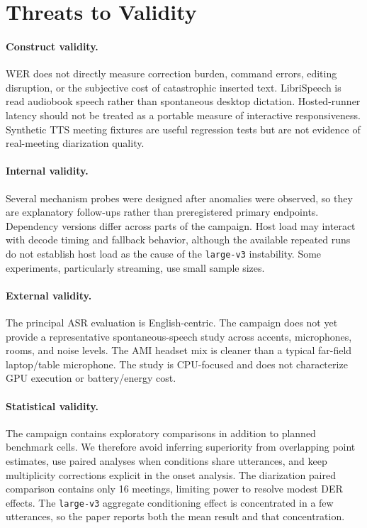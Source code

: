 \section{Threats to Validity}

\paragraph{Construct validity.}
WER does not directly measure correction burden, command errors, editing disruption, or the
subjective cost of catastrophic inserted text. LibriSpeech is read audiobook speech rather than
spontaneous desktop dictation. Hosted-runner latency should not be treated as a portable measure
of interactive responsiveness. Synthetic TTS meeting fixtures are useful regression tests but
are not evidence of real-meeting diarization quality.

\paragraph{Internal validity.}
Several mechanism probes were designed after anomalies were observed, so they are explanatory
follow-ups rather than preregistered primary endpoints. Dependency versions differ across parts
of the campaign. Host load may interact with decode timing and fallback behavior, although the
available repeated runs do not establish host load as the cause of the \texttt{large-v3}
instability. Some experiments, particularly streaming, use small sample sizes.

\paragraph{External validity.}
The principal ASR evaluation is English-centric. The campaign does not yet provide a
representative spontaneous-speech study across accents, microphones, rooms, and noise levels.
The AMI headset mix is cleaner than a typical far-field laptop/table microphone. The study is
CPU-focused and does not characterize GPU execution or battery/energy cost.

\paragraph{Statistical validity.}
The campaign contains exploratory comparisons in addition to planned benchmark cells. We
therefore avoid inferring superiority from overlapping point estimates, use paired analyses when
conditions share utterances, and keep multiplicity corrections explicit in the onset analysis.
The diarization paired comparison contains only 16 meetings, limiting power to resolve modest
DER effects. The \texttt{large-v3} aggregate conditioning effect is concentrated in a few
utterances, so the paper reports both the mean result and that concentration.

